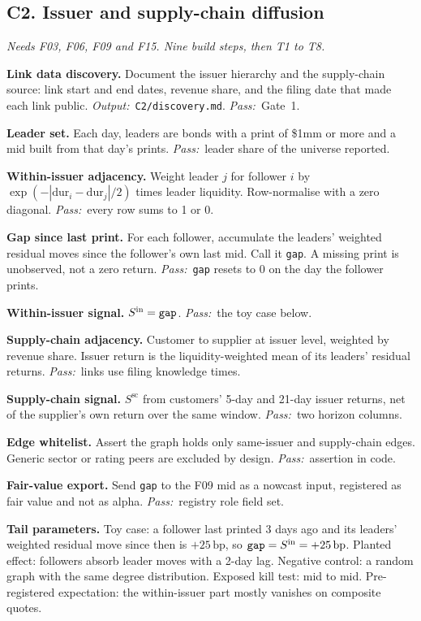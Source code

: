 \documentclass[11pt,letterpaper]{article}
\makeatletter
\newcommand{\code}[1]{\texttt{#1}}
\newcommand{\bp}{\,\mathrm{bp}}
\newcommand*{\twodigit}[1]{\expandafter\@twodigit\csname c@#1\endcsname}
\newcommand*{\@twodigit}[1]{\ifnum#1<10 0\fi\number#1}
\newcommand{\stepname}[1]{\textbf{#1.}}
\newcommand{\Out}{\textit{Output:}~}
\newcommand{\Pass}{\textit{Pass:}~}
\makeatother
\begin{document}
\subsection{C2. Issuer and supply-chain diffusion}
\emph{Needs F03, F06, F09 and F15. Nine build steps, then T1 to T8.}
\begin{ladder}[label=\textbf{C2.\twodigit*}]
\item \stepname{Link data discovery} Document the issuer hierarchy and the supply-chain source: link start and end dates, revenue share, and the filing date that made each link public. \Out \code{C2/discovery.md}. \Pass Gate~1.
\item \stepname{Leader set} Each day, leaders are bonds with a print of \$1mm or more and a mid built from that day's prints. \Pass leader share of the universe reported.
\item \stepname{Within-issuer adjacency} Weight leader $j$ for follower $i$ by $\exp(-|\mathrm{dur}_i-\mathrm{dur}_j|/2)$ times leader liquidity. Row-normalise with a zero diagonal. \Pass every row sums to 1 or 0.
\item \stepname{Gap since last print} For each follower, accumulate the leaders' weighted residual moves since the follower's own last mid. Call it \code{gap}. A missing print is unobserved, not a zero return. \Pass \code{gap} resets to 0 on the day the follower prints.
\item \stepname{Within-issuer signal} $S^{\mathrm{in}}=\text{\code{gap}}$. \Pass the toy case below.
\item \stepname{Supply-chain adjacency} Customer to supplier at issuer level, weighted by revenue share. Issuer return is the liquidity-weighted mean of its leaders' residual returns. \Pass links use filing knowledge times.
\item \stepname{Supply-chain signal} $S^{\mathrm{sc}}$ from customers' 5-day and 21-day issuer returns, net of the supplier's own return over the same window. \Pass two horizon columns.
\item \stepname{Edge whitelist} Assert the graph holds only same-issuer and supply-chain edges. Generic sector or rating peers are excluded by design. \Pass assertion in code.
\item \stepname{Fair-value export} Send \code{gap} to the F09 mid as a nowcast input, registered as fair value and not as alpha. \Pass registry role field set.
\end{ladder}
\textbf{Tail parameters.} Toy case: a follower last printed 3 days ago and its leaders' weighted residual move since then is $+25\bp$, so $\text{\code{gap}}=S^{\mathrm{in}}=+25\bp$. Planted effect: followers absorb leader moves with a 2-day lag. Negative control: a random graph with the same degree distribution. Exposed kill test: mid to mid. Pre-registered expectation: the within-issuer part mostly vanishes on composite quotes.
\end{document}
